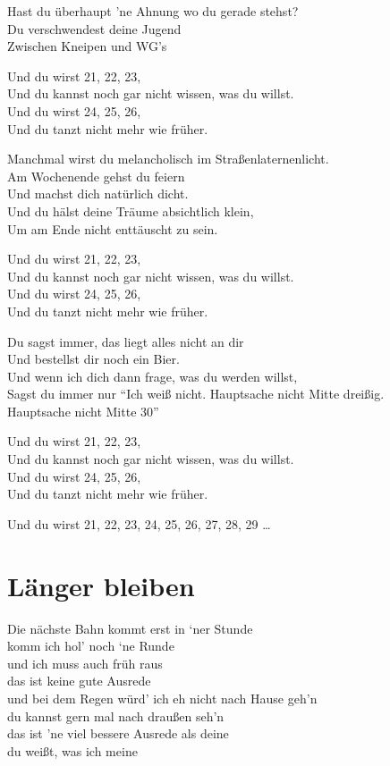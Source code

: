 \documentclass[]{book}
\begin{document}
Hast du überhaupt 'ne Ahnung wo du gerade stehst?\\
Du verschwendest deine Jugend\\
Zwischen Kneipen und WG's

Und du wirst 21, 22, 23,\\
Und du kannst noch gar nicht wissen, was du willst.\\
Und du wirst 24, 25, 26,\\
Und du tanzt nicht mehr wie früher.

Manchmal wirst du melancholisch im Straßenlaternenlicht.\\
Am Wochenende gehst du feiern\\
Und machst dich natürlich dicht.\\
Und du hälst deine Träume absichtlich klein,\\
Um am Ende nicht enttäuscht zu sein.

Und du wirst 21, 22, 23,\\
Und du kannst noch gar nicht wissen, was du willst.\\
Und du wirst 24, 25, 26,\\
Und du tanzt nicht mehr wie früher.

Du sagst immer, das liegt alles nicht an dir\\
Und bestellst dir noch ein Bier.\\
Und wenn ich dich dann frage, was du werden willst,\\
Sagst du immer nur ``Ich weiß nicht. Hauptsache nicht Mitte dreißig.\\
Hauptsache nicht Mitte 30''

Und du wirst 21, 22, 23,\\
Und du kannst noch gar nicht wissen, was du willst.\\
Und du wirst 24, 25, 26,\\
Und du tanzt nicht mehr wie früher.

Und du wirst 21, 22, 23, 24, 25, 26, 27, 28, 29 \ldots{}

\hypertarget{langer-bleiben}{%
\section{Länger bleiben}\label{langer-bleiben}}

Die nächste Bahn kommt erst in `ner Stunde\\
komm ich hol' noch `ne Runde\\
und ich muss auch früh raus\\
das ist keine gute Ausrede\\
und bei dem Regen würd' ich eh nicht nach Hause geh'n\\
du kannst gern mal nach draußen seh'n\\
das ist 'ne viel bessere Ausrede als deine\\
du weißt, was ich meine
\end{document}
